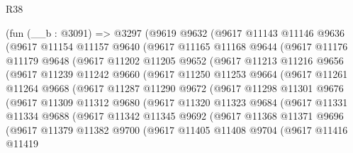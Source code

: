 \begin{lexlean}{R38}
\begin{coremodule}
    (fun (__b : @3091) =>
    @3297
      (@9619
        @9632
        (@9617
          @11143
          @11146
          @9636
          (@9617
            @11154
            @11157
            @9640
            (@9617
              @11165
              @11168
              @9644
              (@9617
                @11176
                @11179
                @9648
                (@9617
                  @11202
                  @11205
                  @9652
                  (@9617
                    @11213
                    @11216
                    @9656
                    (@9617
                      @11239
                      @11242
                      @9660
                      (@9617
                        @11250
                        @11253
                        @9664
                        (@9617
                          @11261
                          @11264
                          @9668
                          (@9617
                            @11287
                            @11290
                            @9672
                            (@9617
                              @11298
                              @11301
                              @9676
                              (@9617
                                @11309
                                @11312
                                @9680
                                (@9617
                                  @11320
                                  @11323
                                  @9684
                                  (@9617
                                    @11331
                                    @11334
                                    @9688
                                    (@9617
                                      @11342
                                      @11345
                                      @9692
                                      (@9617
                                        @11368
                                        @11371
                                        @9696
                                        (@9617
                                          @11379
                                          @11382
                                          @9700
                                          (@9617
                                            @11405
                                            @11408
                                            @9704
                                            (@9617
                                              @11416
                                              @11419

\end{coremodule}
\end{lexlean}
